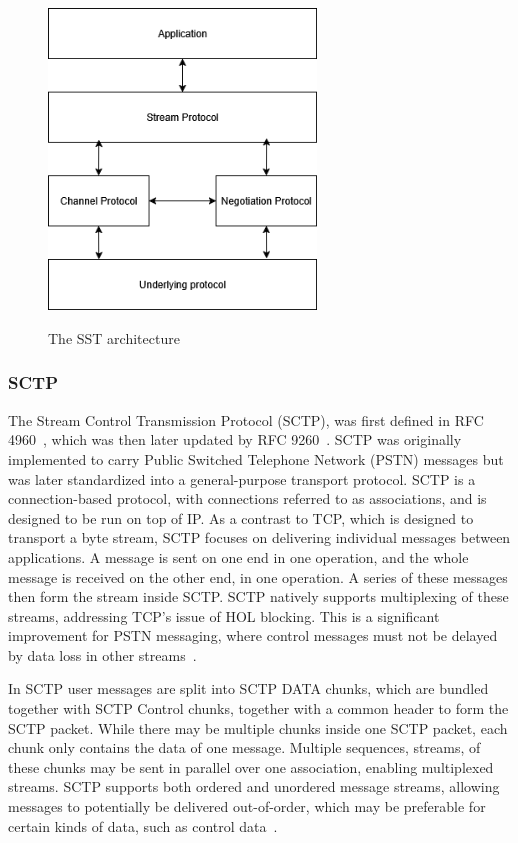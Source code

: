 \documentclass[english, 12pt, a4paper, elec, utf8, a-2b, online]{aaltothesis}
\begin{document}
\begin{figure}[h]
	\centering
	\includegraphics[alt={Diagram of the SST architecture.}, height=8cm]{./images/sst.png}
	\caption{The SST architecture}
	\label{fig:sst_arc}
\end{figure}

\subsubsection{SCTP}

The Stream Control Transmission Protocol (SCTP), was first defined in RFC 4960~\cite{rfc4960},
which was then later updated by RFC 9260~\cite{rfc4960}. SCTP was originally implemented
to carry Public Switched Telephone Network (PSTN) messages but was later standardized
into a general-purpose transport protocol. SCTP is a connection-based protocol, with connections
referred to as associations, and is designed to be run on top of IP. As a contrast
to TCP, which is designed to transport a byte stream, SCTP focuses on delivering individual
messages between applications. A message is sent on one end in one operation, and
the whole message is received on the other end, in one operation. A series of these
messages then form the stream inside SCTP. SCTP natively supports multiplexing of these streams, addressing TCP's issue
of HOL blocking. This is a significant improvement for PSTN messaging, where control
messages must not be delayed by data loss in other streams~\cite{rfc9260}.

In SCTP user messages are split into SCTP DATA chunks, which are bundled together
with SCTP Control chunks, together with a common header to form the SCTP packet. While
there may be multiple chunks inside one SCTP packet, each chunk only contains the data
of one message. Multiple sequences, streams, of these chunks may be sent in parallel
over one association, enabling multiplexed streams. SCTP supports both ordered and
unordered message streams, allowing messages to potentially be delivered out-of-order,
which may be preferable for certain kinds of data, such as control data~\cite{rfc9260}.
\end{document}
